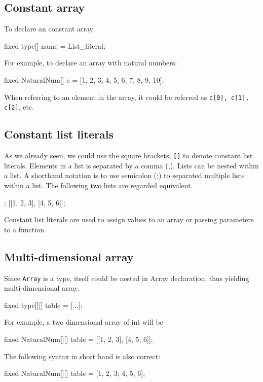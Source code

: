 \documentclass[12pt]{article}
\begin{document}
\subsection{Constant array}
To declare an constant array
\begin{blogcode}
fixed type[] name = List_literal;
\end{blogcode}

For example, to declare an array with natural numbers:
\begin{blogcode}
fixed NaturalNum[] c = [1, 2, 3, 4, 5, 6, 7, 8, 9, 10];
\end{blogcode}

When referring to an element in the array, it could be referred as \texttt{c[0], c[1], c[2]}, etc.

\subsection{Constant list literals}
As we already seen, we could use the square brackets, \texttt{[]} to denote constant list literals.
Elements in a list is separated by a comma (,). Lists can be nested within a list. A shorthand notation is to use semicolon (;) to separated multiple lists within a list.
The following two lists are regarded equivalent.
\begin{blogcode}
[1, 2, 3; 4, 5, 6];
[[1, 2, 3], [4, 5, 6]];
\end{blogcode}

Constant list literals are used to assign values to an array or passing parameters to a function.

\subsection{Multi-dimensional array}
Since \texttt{Array} is a type, itself could be nested in Array declaration, thus yielding multi-dimensional array. 
\begin{blogcode}
fixed type[][] table = [...];
\end{blogcode}

For example, a two dimensional array of int will be
\begin{blogcode}
fixed NaturalNum[][] table = [[1, 2, 3], [4, 5, 6]];
\end{blogcode}
The following syntax in short hand is also correct:
\begin{blogcode}
fixed NaturalNum[][] table = [1, 2, 3; 4, 5, 6];
\end{blogcode}
\end{document}
